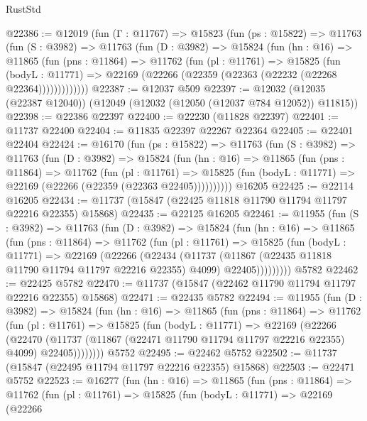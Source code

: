 \begin{lexlean}{RustStd}
\begin{coremodule}
@22386 := @12019
    (fun (Γ : @11767) =>
    @15823
      (fun (ps : @15822) =>
      @11763
        (fun (S : @3982) =>
        @11763
          (fun (D : @3982) =>
          @15824
            (fun (hn : @16) =>
            @11865
              (fun (pns : @11864) =>
              @11762
                (fun (pl : @11761) =>
                @15825
                  (fun (bodyL : @11771) =>
                  @22169 (@22266 (@22359 (@22363 (@22232 (@22268 @22364)))))))))))))
@22387 := @12037 @509
@22397 := @12032 (@12035 (@22387 @12040)) (@12049 (@12032 (@12050 (@12037 @784 @12052)) @11815))
@22398 := @22386 @22397
@22400 := @22230 (@11828 @22397)
@22401 := @11737 @22400
@22404 := @11835 @22397 @22267 @22364
@22405 := @22401 @22404
@22424 := @16170
    (fun (ps : @15822) =>
    @11763
      (fun (S : @3982) =>
      @11763
        (fun (D : @3982) =>
        @15824
          (fun (hn : @16) =>
          @11865
            (fun (pns : @11864) =>
            @11762
              (fun (pl : @11761) =>
              @15825 (fun (bodyL : @11771) => @22169 (@22266 (@22359 (@22363 @22405))))))))))
    @16205
@22425 := @22114 @16205
@22434 := @11737 (@15847 (@22425 @11818 @11790 @11794 @11797 @22216 @22355) @15868)
@22435 := @22125 @16205
@22461 := @11955
    (fun (S : @3982) =>
    @11763
      (fun (D : @3982) =>
      @15824
        (fun (hn : @16) =>
        @11865
          (fun (pns : @11864) =>
          @11762
            (fun (pl : @11761) =>
            @15825
              (fun (bodyL : @11771) =>
              @22169
                (@22266
                  (@22434
                    (@11737
                      (@11867 (@22435 @11818 @11790 @11794 @11797 @22216 @22355) @4099)
                      @22405)))))))))
    @5782
@22462 := @22425 @5782
@22470 := @11737 (@15847 (@22462 @11790 @11794 @11797 @22216 @22355) @15868)
@22471 := @22435 @5782
@22494 := @11955
    (fun (D : @3982) =>
    @15824
      (fun (hn : @16) =>
      @11865
        (fun (pns : @11864) =>
        @11762
          (fun (pl : @11761) =>
          @15825
            (fun (bodyL : @11771) =>
            @22169
              (@22266
                (@22470
                  (@11737 (@11867 (@22471 @11790 @11794 @11797 @22216 @22355) @4099) @22405))))))))
    @5752
@22495 := @22462 @5752
@22502 := @11737 (@15847 (@22495 @11794 @11797 @22216 @22355) @15868)
@22503 := @22471 @5752
@22523 := @16277
    (fun (hn : @16) =>
    @11865
      (fun (pns : @11864) =>
      @11762
        (fun (pl : @11761) =>
        @15825
          (fun (bodyL : @11771) =>
          @22169
            (@22266

\end{coremodule}
\end{lexlean}
